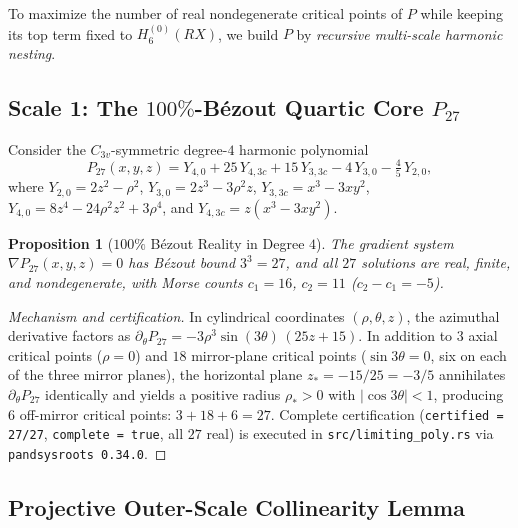 \documentclass[11pt,a4paper]{amsart}
\newtheorem{proposition}[theorem]{Proposition}
\theoremstyle{definition}
\begin{document}
To maximize the number of real nondegenerate critical points of $P$ while
keeping its top term fixed to $H_6^{(0)}(R X)$, we build $P$ by \emph{recursive
multi-scale harmonic nesting}.

\subsection{Scale 1: The $100\%$-B\'ezout Quartic Core $P_{27}$}

Consider the $C_{3v}$-symmetric degree-$4$ harmonic polynomial
\begin{equation}\label{eq:p27}
  P_{27}(x,y,z) = Y_{4,0} + 25\,Y_{4,3c} + 15\,Y_{3,3c} - 4\,Y_{3,0} - \tfrac{4}{5}\,Y_{2,0},
\end{equation}
where $Y_{2,0} = 2z^2 - \rho^2$, $Y_{3,0} = 2z^3 - 3\rho^2 z$,
$Y_{3,3c} = x^3 - 3xy^2$,
$Y_{4,0} = 8z^4 - 24\rho^2 z^2 + 3\rho^4$, and
$Y_{4,3c} = z(x^3 - 3xy^2)$.

\begin{proposition}[$100\%$ B\'ezout Reality in Degree $4$]\label{prop:p27}
The gradient system $\nabla P_{27}(x,y,z) = 0$ has B\'ezout bound $3^3 = 27$,
and all $27$ solutions are real, finite, and nondegenerate, with Morse counts
$c_1 = 16$, $c_2 = 11$ ($c_2 - c_1 = -5$).
\end{proposition}

\begin{proof}[Mechanism and certification]
In cylindrical coordinates $(\rho,\theta,z)$, the azimuthal derivative factors
as $\partial_\theta P_{27} = -3\rho^3 \sin(3\theta)\,(25z + 15)$. In addition
to $3$ axial critical points ($\rho = 0$) and $18$ mirror-plane critical points
($\sin 3\theta = 0$, six on each of the three mirror planes), the horizontal
plane $z_* = -15/25 = -3/5$ annihilates $\partial_\theta P_{27}$ identically
and yields a positive radius $\rho_* > 0$ with $|\cos 3\theta| < 1$, producing
$6$ off-mirror critical points: $3 + 18 + 6 = 27$. Complete certification
(\texttt{certified = 27/27}, \texttt{complete = true}, all $27$ real) is
executed in \texttt{src/limiting\_poly.rs} via \texttt{pandsysroots~0.34.0}.
\end{proof}

\subsection{Projective Outer-Scale Collinearity Lemma}
\end{document}
